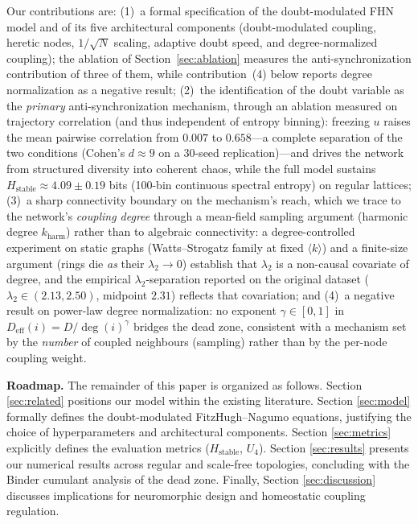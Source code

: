 ﻿\documentclass[11pt]{article}
\begin{document}
Our contributions are: (1)~a formal specification of the doubt-modulated FHN model and of its five architectural components (doubt-modulated coupling, heretic nodes, $1/\sqrt{N}$ scaling, adaptive doubt speed, and degree-normalized coupling); the ablation of Section~\ref{sec:ablation} measures the anti-synchronization contribution of three of them, while contribution~(4) below reports degree normalization as a negative result; (2)~the identification of the doubt variable as the \emph{primary} anti-synchronization mechanism, through an ablation measured on trajectory correlation (and thus independent of entropy binning): freezing $u$ raises the mean pairwise correlation from $0.007$ to $0.658$---a complete separation of the two conditions (Cohen's $d \approx 9$ on a 30-seed replication)---and drives the network from structured diversity into coherent chaos, while the full model sustains $H_{\text{stable}} \approx 4.09 \pm 0.19$ bits (100-bin continuous spectral entropy) on regular lattices; (3)~a sharp connectivity boundary on the mechanism's reach, which we trace to the network's \emph{coupling degree} through a mean-field sampling argument (harmonic degree $k_{\mathrm{harm}}$) rather than to algebraic connectivity: a degree-controlled experiment on static graphs (Watts--Strogatz family at fixed $\langle k\rangle$) and a finite-size argument (rings die \emph{as} their $\lambda_2 \to 0$) establish that $\lambda_2$ is a non-causal covariate of degree, and the empirical $\lambda_2$-separation reported on the original dataset ($\lambda_2 \in (2.13, 2.50)$, midpoint $2.31$) reflects that covariation; and (4)~a negative result on power-law degree normalization: no exponent $\gamma \in [0, 1]$ in $D_{\text{eff}}(i) = D/\deg(i)^\gamma$ bridges the dead zone, consistent with a mechanism set by the \emph{number} of coupled neighbours (sampling) rather than by the per-node coupling weight.

\textbf{Roadmap.} The remainder of this paper is organized as follows. Section \ref{sec:related} positions our model within the existing literature. Section \ref{sec:model} formally defines the doubt-modulated FitzHugh--Nagumo equations, justifying the choice of hyperparameters and architectural components. Section \ref{sec:metrics} explicitly defines the evaluation metrics ($H_{\text{stable}}$, $U_4$). Section \ref{sec:results} presents our numerical results across regular and scale-free topologies, concluding with the Binder cumulant analysis of the dead zone. Finally, Section \ref{sec:discussion} discusses implications for neuromorphic design and homeostatic coupling regulation.
\end{document}
